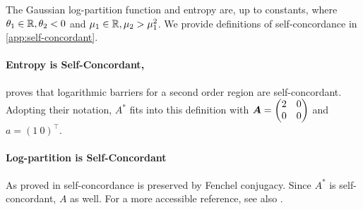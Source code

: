 \documentclass[twoside]{article}
\newcommand{\TODO}[1]{\textcolor{cyan}{(TODO #1)}}
\newcommand{\logpart}{A}
\newcommand{\conj}{{\logpart^*}}
\newcommand{\nat}{\theta}
\newcommand{\m}{\mu}
\begin{document}
The Gaussian log-partition function and entropy are, up to constants,
\alignn{
	\logpart(\nat) &= \frac{\nat_1^2}{-4\nat_2} - \half \log(-\nat_2) \\
	\conj(\m) &= - \half \log (\mu_2 - \mu_1^2) \; ,
}
where $\nat_1\in\real, \nat_2 <0$ and $\mu_1\in\mathbb{R}, \mu_2>\mu_1^2$.
We provide definitions of self-concordance in \cref{app:self-concordant}.



\paragraph{Entropy is Self-Concordant,}
\citet[Example 4.1.1.4,   p.177]{nesterov2003introductory} proves that logarithmic barriers for a second order region are self-concordant. Adopting their notation, $\conj$ fits into this definition with ${\bm{A}} = \begin{pmatrix} 2 & 0 \\ 0 & 0 \end{pmatrix}$ and $a = ( 1 \ 0 )^\top$.

\paragraph{Log-partition is Self-Concordant}
As proved in \citet{nesterov1994interior} self-concordance is preserved by Fenchel conjugacy.
Since $\conj$ is self-concordant, $\logpart$ as well.
For a more accessible reference, see also \citet[Prop.~6]{sun2019generalized}.
\end{document}
